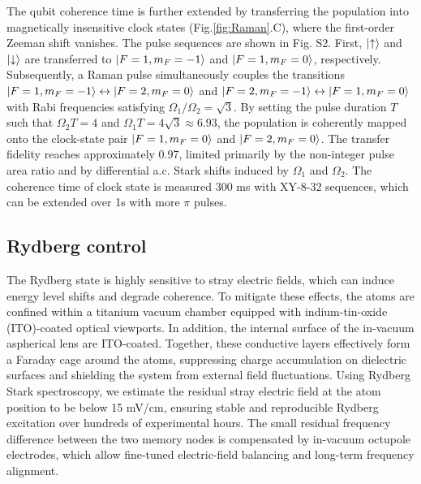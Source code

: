 \documentclass[aps,reprint,showpacs,superscriptaddress]{revtex4-2}
\begin{document}
The qubit coherence time is further extended by transferring the population into magnetically insensitive clock states (Fig.\ref{fig:Raman}.C), where the first-order Zeeman shift vanishes. The pulse sequences are shown in Fig. S2. First, $\ket{\uparrow}$ and $\ket{\downarrow}$ are transferred to $\ket{F = 1, m_F = -1}$ and $\ket{F = 1, m_F = 0}$, respectively. Subsequently, a Raman pulse simultaneously couples the transitions $\ket{F = 1, m_F = -1} \leftrightarrow \ket{F = 2, m_F = 0}$ and $\ket{F = 2, m_F = -1} \leftrightarrow \ket{F = 1, m_F = 0}$ with Rabi frequencies satisfying $\Omega_1 / \Omega_2 = \sqrt{3}$. By setting the pulse duration $T$ such that $\Omega_2 T = 4$ and $\Omega_1 T = 4\sqrt{3} \approx 6.93$, the population is coherently mapped onto the clock-state pair $\ket{F = 1, m_F = 0}$ and $\ket{F = 2, m_F = 0}$. The transfer fidelity reaches approximately 0.97, limited primarily by the non-integer pulse area ratio and by differential a.c. Stark shifts induced by $\Omega_1$ and $\Omega_2$. The coherence time of clock state is measured 300 ms with XY-8-32 sequences, which can be extended over 1s with more $\pi$ pulses.

\subsection{Rydberg control}
The Rydberg state is highly sensitive to stray electric fields, which can induce energy level shifts and degrade coherence. To mitigate these effects, the atoms are confined within a titanium vacuum chamber equipped with indium-tin-oxide (ITO)-coated optical viewports. In addition, the internal surface of the in-vacuum aspherical lens are ITO-coated. Together, these conductive layers effectively form a Faraday cage around the atoms, suppressing charge accumulation on dielectric surfaces and shielding the system from external field fluctuations. Using Rydberg Stark spectroscopy, we estimate the residual stray electric field at the atom position to be below 15 mV/cm, ensuring stable and reproducible Rydberg excitation over hundreds of experimental hours. The small residual frequency difference between the two memory nodes is compensated by in-vacuum octupole electrodes, which allow fine-tuned electric-field balancing and long-term frequency alignment.
\end{document}
